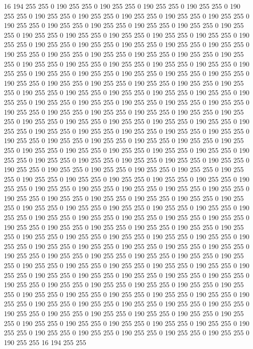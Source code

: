 16 194 255 255 0 190 255 255 0 190 255 255 0 190 255 255 0 190 255 255 0 190 255 255 0 190 255 255 0 190 255 255 0 190 255 255 0 190 255 255 0 190 255 255 0 190 255 255 0 190 255 255 0 190 255 255 0 190 255 255 0 190 255 255 0 190 255 255 0 190 255 255 0 190 255 255 0 190 255 255 0 190 255 255 0 190 255 255 0 190 255 255 0 190 255 255 0 190 255 255 0 190 255 255 0 190 255 255 0 190 255 255 0 190 255 255 0 190 255 255 0 190 255 255 0 190 255 255 0 190 255 255 0 190 255 255 0 190 255 255 0 190 255 255 0 190 255 255 0 190 255 255 0 190 255 255 0 190 255 255 0 190 255 255 0 190 255 255 0 190 255 255 0 190 255 255 0 190 255 255 0 190 255 255 0 190 255 255 0 190 255 255 0 190 255 255 0 190 255 255 
0 190 255 255 0 190 255 255 0 190 255 255 0 190 255 255 0 190 255 255 0 190 255 255 0 190 255 255 0 190 255 255 0 190 255 255 0 190 255 255 0 190 255 255 0 190 255 255 0 190 255 255 0 190 255 255 0 190 255 255 0 190 255 255 0 190 255 255 0 190 255 255 0 190 255 255 0 190 255 255 0 190 255 255 0 190 255 255 0 190 255 255 0 190 255 255 0 190 255 255 0 190 255 255 0 190 255 255 0 190 255 255 0 190 255 255 0 190 255 255 0 190 255 255 0 190 255 255 0 190 255 255 0 190 255 255 0 190 255 255 0 190 255 255 0 190 255 255 0 190 255 255 0 190 255 255 0 190 255 255 0 190 255 255 0 190 255 255 0 190 255 255 0 190 255 255 0 190 255 255 0 190 255 255 0 190 255 255 0 190 255 255 0 190 255 255 0 190 255 255 
0 190 255 255 0 190 255 255 0 190 255 255 0 190 255 255 0 190 255 255 0 190 255 255 0 190 255 255 0 190 255 255 0 190 255 255 0 190 255 255 0 190 255 255 0 190 255 255 0 190 255 255 0 190 255 255 0 190 255 255 0 190 255 255 0 190 255 255 0 190 255 255 0 190 255 255 0 190 255 255 0 190 255 255 0 190 255 255 0 190 255 255 0 190 255 255 0 190 255 255 0 190 255 255 0 190 255 255 0 190 255 255 0 190 255 255 0 190 255 255 0 190 255 255 0 190 255 255 0 190 255 255 0 190 255 255 0 190 255 255 0 190 255 255 0 190 255 255 0 190 255 255 0 190 255 255 0 190 255 255 0 190 255 255 0 190 255 255 0 190 255 255 0 190 255 255 0 190 255 255 0 190 255 255 0 190 255 255 0 190 255 255 0 190 255 255 0 190 255 255 
0 190 255 255 0 190 255 255 0 190 255 255 0 190 255 255 0 190 255 255 0 190 255 255 0 190 255 255 0 190 255 255 0 190 255 255 0 190 255 255 0 190 255 255 0 190 255 255 0 190 255 255 0 190 255 255 0 190 255 255 0 190 255 255 0 190 255 255 0 190 255 255 0 190 255 255 0 190 255 255 0 190 255 255 0 190 255 255 0 190 255 255 0 190 255 255 0 190 255 255 0 190 255 255 0 190 255 255 0 190 255 255 0 190 255 255 0 190 255 255 0 190 255 255 0 190 255 255 0 190 255 255 0 190 255 255 0 190 255 255 0 190 255 255 0 190 255 255 0 190 255 255 0 190 255 255 0 190 255 255 0 190 255 255 0 190 255 255 0 190 255 255 0 190 255 255 0 190 255 255 0 190 255 255 0 190 255 255 0 190 255 255 0 190 255 255 16 194 255 255 
